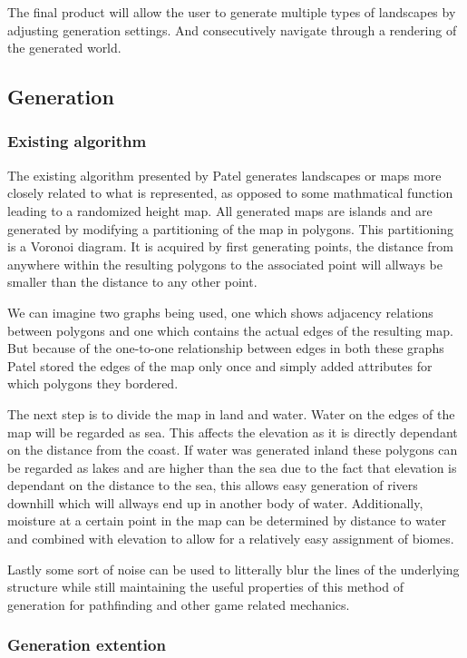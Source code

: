 The final product will allow the user to generate multiple types of landscapes by adjusting generation settings. And consecutively navigate through a rendering of the generated world. 

\subsection{Generation}

\subsubsection{Existing algorithm}

The existing algorithm presented by Patel\cite{redblob} generates landscapes or maps more closely related to what is represented, as opposed to some mathmatical function leading to a randomized height map. All generated maps are islands and are generated by modifying a partitioning of the map in polygons. This partitioning is a Voronoi diagram. It is acquired by first generating points, the distance from anywhere within the resulting polygons to the associated point will allways be smaller than the distance to any other point.

We can imagine two graphs being used, one which shows adjacency relations between polygons and one which contains the actual edges of the resulting map. But because of the one-to-one relationship between edges in both these graphs Patel\cite{redblob} stored the edges of the map only once and simply added attributes for which polygons they bordered.

The next step is to divide the map in land and water. Water on the edges of the map will be regarded as sea. This affects the elevation as it is directly dependant on the distance from the coast. If water was generated inland these polygons can be regarded as lakes and are higher than the sea due to the fact that elevation is dependant on the distance to the sea, this allows easy generation of rivers downhill which will allways end up in another body of water. Additionally, moisture at a certain point in the map can be determined by distance to water and combined with elevation to allow for a relatively easy assignment of biomes.

Lastly some sort of noise can be used to litterally blur the lines of the underlying structure while still maintaining the useful properties of this method of generation for pathfinding and other game related mechanics.

\subsubsection{Generation extention}

